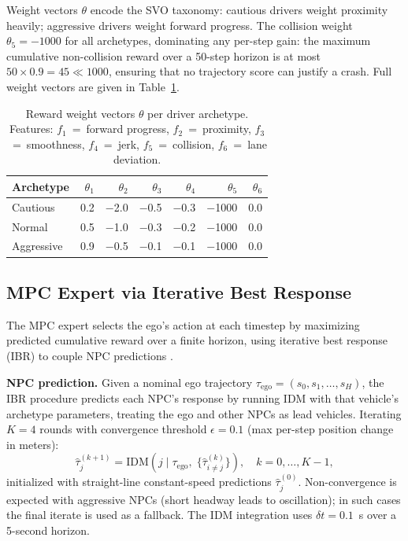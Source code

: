 \documentclass[conference]{IEEEtran}
\begin{document}
Weight vectors $\theta$ encode the SVO taxonomy: cautious drivers weight
proximity heavily; aggressive drivers weight forward progress.
The collision weight $\theta_5 = -1000$ for all archetypes, dominating
any per-step gain: the maximum cumulative non-collision reward over a 50-step
horizon is at most $50 \times 0.9 = 45 \ll 1000$, ensuring that no
trajectory score can justify a crash.
Full weight vectors are given in Table~\ref{tab:weights}.

\begin{table}[t]
  \caption{Reward weight vectors $\theta$ per driver archetype.
    Features: $f_1$~=~forward progress, $f_2$~=~proximity,
    $f_3$~=~smoothness, $f_4$~=~jerk, $f_5$~=~collision, $f_6$~=~lane deviation.}
  \label{tab:weights}
  \centering
  \begin{tabular}{lrrrrrr}
    \toprule
    Archetype & $\theta_1$ & $\theta_2$ & $\theta_3$ & $\theta_4$ & $\theta_5$ & $\theta_6$ \\
    \midrule
    Cautious   &  0.2 & $-$2.0 & $-$0.5 & $-$0.3 & $-$1000 & 0.0 \\
    Normal     &  0.5 & $-$1.0 & $-$0.3 & $-$0.2 & $-$1000 & 0.0 \\
    Aggressive &  0.9 & $-$0.5 & $-$0.1 & $-$0.1 & $-$1000 & 0.0 \\
    \bottomrule
  \end{tabular}
\end{table}

\subsection{MPC Expert via Iterative Best Response}

The MPC expert selects the ego's action at each timestep by maximizing
predicted cumulative reward over a finite horizon, using iterative
best response (IBR) to couple NPC predictions \cite{sadigh2016planning}.

\textbf{NPC prediction.}
Given a nominal ego trajectory $\tau_{\text{ego}} = (s_0, s_1, \ldots, s_H)$,
the IBR procedure predicts each NPC's response by running IDM with that
vehicle's archetype parameters, treating the ego and other NPCs as lead
vehicles.
Iterating $K = 4$ rounds with convergence threshold $\epsilon = 0.1$
(max per-step position change in meters):
\begin{equation}
  \hat{\tau}_j^{(k+1)} = \text{IDM}\!\left(j \;\Big|\; \tau_{\text{ego}},\;
  \bigl\{\hat{\tau}_{i \neq j}^{(k)}\bigr\}\right), \quad k = 0, \ldots, K-1,
  \label{eq:ibr}
\end{equation}
initialized with straight-line constant-speed predictions
$\hat{\tau}_j^{(0)}$.
Non-convergence is expected with aggressive NPCs (short headway leads to
oscillation); in such cases the final iterate is used as a fallback.
The IDM integration uses $\delta t = 0.1$~s over a 5-second horizon.
\end{document}
